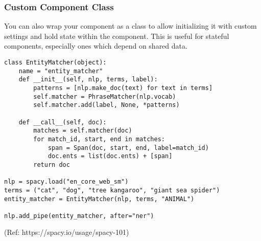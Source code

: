 \begin{frame}[fragile]\frametitle{Custom Component Class}
You can also wrap your component as a class to allow initializing it with custom settings and hold state within the component. This is useful for stateful components, especially ones which depend on shared data.
		\begin{lstlisting}
class EntityMatcher(object):
    name = "entity_matcher"
    def __init__(self, nlp, terms, label):
        patterns = [nlp.make_doc(text) for text in terms]
        self.matcher = PhraseMatcher(nlp.vocab)
        self.matcher.add(label, None, *patterns)

    def __call__(self, doc):
        matches = self.matcher(doc)
        for match_id, start, end in matches:
            span = Span(doc, start, end, label=match_id)
            doc.ents = list(doc.ents) + [span]
        return doc

nlp = spacy.load("en_core_web_sm")
terms = ("cat", "dog", "tree kangaroo", "giant sea spider")
entity_matcher = EntityMatcher(nlp, terms, "ANIMAL")

nlp.add_pipe(entity_matcher, after="ner")
\end{lstlisting}	
	
{\tiny (Ref: https://spacy.io/usage/spacy-101)}
\end{frame}
